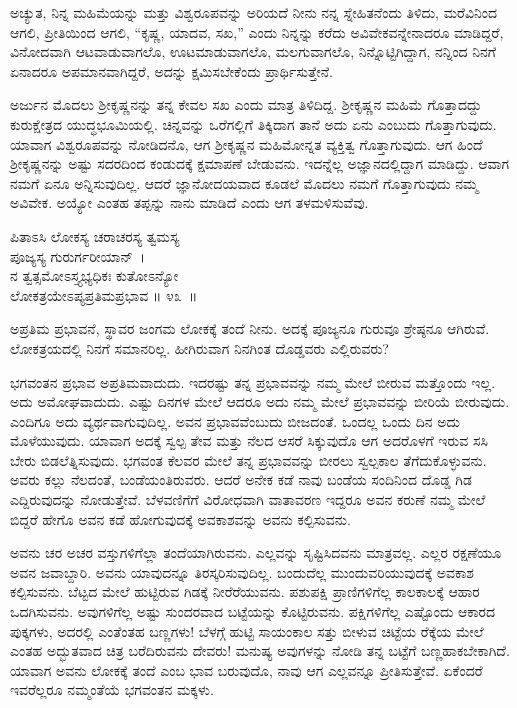 \begin{artha}
ಅಚ್ಯುತ, ನಿನ್ನ ಮಹಿಮೆಯನ್ನು ಮತ್ತು ವಿಶ್ವರೂಪವನ್ನು ಅರಿಯದೆ ನೀನು ನನ್ನ ಸ್ನೇಹಿತನೆಂದು ತಿಳಿದು, ಮರೆವಿನಿಂದ ಆಗಲಿ, ಪ್ರೀತಿಯಿಂದ ಆಗಲಿ, “ಕೃಷ್ಣ, ಯಾದವ, ಸಖ,” ಎಂದು ನಿನ್ನನ್ನು ಕರೆದು ಅವಿವೇಕವನ್ನೇನಾದರೂ ಮಾಡಿದ್ದರೆ, ವಿನೋದವಾಗಿ ಆಟವಾಡುವಾಗಲೊ, ಊಟಮಾಡುವಾಗಲೊ, ಮಲಗುವಾಗಲೊ, ನಿನ್ನೊಟ್ಟಿಗಿದ್ದಾಗ, ನನ್ನಿಂದ ನಿನಗೆ ಏನಾದರೂ ಅಪಮಾನವಾಗಿದ್ದರೆ, ಅದನ್ನು ಕ್ಷಮಿಸಬೇಕೆಂದು ಪ್ರಾರ್ಥಿಸುತ್ತೇನೆ.
\end{artha}

ಅರ್ಜುನ ಮೊದಲು ಶ‍್ರೀಕೃಷ್ಣನನ್ನು ತನ್ನ ಕೇವಲ ಸಖ ಎಂದು ಮಾತ್ರ ತಿಳಿದಿದ್ದ. ಶ‍್ರೀಕೃಷ್ಣನ ಮಹಿಮೆ ಗೊತ್ತಾದದ್ದು ಕುರುಕ್ಷೇತ್ರದ ಯುದ್ಧಭೂಮಿಯಲ್ಲಿ. ಚಿನ್ನವನ್ನು ಒರೆಗಲ್ಲಿಗೆ ತಿಕ್ಕಿದಾಗ ತಾನೆ ಅದು ಏನು ಎಂಬುದು ಗೊತ್ತಾಗುವುದು. ಯಾವಾಗ ವಿಶ್ವರೂಪವನ್ನು ನೋಡಿ\-ದನೊ, ಆಗ ಶ‍್ರೀಕೃಷ್ಣನ ಮಹಿಮೋನ್ನತ ವ್ಯಕ್ತಿತ್ವ ಗೊತ್ತಾಗುವುದು. ಆಗ ಹಿಂದೆ ಶ‍್ರೀಕೃಷ್ಣನನ್ನು ಅಷ್ಟು ಸದರದಿಂದ ಕಂಡುದಕ್ಕೆ ಕ್ಷಮಾಪಣೆ ಬೇಡುವನು. ಇದನ್ನೆಲ್ಲ ಅಜ್ಞಾನದಲ್ಲಿದ್ದಾಗ ಮಾಡಿದ್ದು. ಆವಾಗ ನಮಗೆ ಏನೂ ಅನ್ನಿಸುವುದಿಲ್ಲ. ಆದರೆ ಜ್ಞಾನೋದಯವಾದ ಕೂಡಲೆ ಮೊದಲು ನಮಗೆ ಗೊತ್ತಾಗುವುದು ನಮ್ಮ ಅವಿವೇಕ. ಅಯ್ಯೋ ಎಂತಹ ತಪ್ಪನ್ನು ನಾನು ಮಾಡಿದೆ ಎಂದು ಆಗ ತಳಮಳಿಸುವೆವು.

\begin{shloka}
ಪಿತಾಽಸಿ ಲೋಕಸ್ಯ ಚರಾಚರಸ್ಯ ತ್ವಮಸ್ಯ \\ ಪೂಜ್ಯಸ್ಯ ಗುರುರ್ಗರೀಯಾನ್~।\\ನ ತ್ವತ್ಸಮೋಽಸ್ತ್ಯಭ್ಯಧಿಕಃ ಕುತೋಽನ್ಯೋ \\ ಲೋಕತ್ರಯೇಽಪ್ಯಪ್ರತಿಮಪ್ರಭಾವ \hfill॥ ೪೩~॥
\end{shloka}

\begin{artha}
ಅಪ್ರತಿಮ ಪ್ರಭಾವನೆ, ಸ್ಥಾವರ ಜಂಗಮ ಲೋಕಕ್ಕೆ ತಂದೆ ನೀನು. ಅದಕ್ಕೆ ಪೂಜ್ಯನೂ ಗುರುವೂ ಶ್ರೇಷ್ಠನೂ ಆಗಿರುವೆ. ಲೋಕತ್ರಯದಲ್ಲಿ ನಿನಗೆ ಸಮಾನರಿಲ್ಲ. ಹೀಗಿರುವಾಗ ನಿನಗಿಂತ ದೊಡ್ಡವರು ಎಲ್ಲಿರುವರು?
\end{artha}

ಭಗವಂತನ ಪ್ರಭಾವ ಅಪ್ರತಿಮವಾದುದು. ಇದರಷ್ಟು ತನ್ನ ಪ್ರಭಾವವನ್ನು ನಮ್ಮ ಮೇಲೆ ಬೀರುವ ಮತ್ತೊಂದು ಇಲ್ಲ. ಅದು ಅಮೋಘವಾದುದು. ಎಷ್ಟು ದಿನಗಳ ಮೇಲೆ ಆದರೂ ಅದು ನಮ್ಮ ಮೇಲೆ ಪ್ರಭಾವವನ್ನು ಬೀರಿಯೆ ಬೀರುವುದು. ಎಂದಿಗೂ ಅದು ವ್ಯರ್ಥವಾಗುವುದಿಲ್ಲ. ಅವನ ಪ್ರಭಾವವೆಂಬುದು ಬೀಜದಂತೆ. ಒಂದಲ್ಲ ಒಂದು ದಿನ ಅದು ಮೊಳೆಯುವುದು. ಯಾವಾಗ ಅದಕ್ಕೆ ಸ್ವಲ್ಪ ತೇವ ಮತ್ತು ನೆಲದ ಆಸರೆ ಸಿಕ್ಕುವುದೊ ಆಗ ಅದರೊಳಗೆ ಇರುವ ಸಸಿ ಬೇರು ಬಿಡಲೆತ್ನಿಸುವುದು. ಭಗವಂತ ಕೆಲವರ ಮೇಲೆ ತನ್ನ ಪ್ರಭಾವವನ್ನು ಬೀರಲು ಸ್ವಲ್ಪಕಾಲ ತೆಗೆದುಕೊಳ್ಳುವನು. ಅವರು ಕಲ್ಲು ನೆಲದಂತೆ, ಬಂಡೆಯಂತಿರುವರು. ಆದರೆ ಅನೇಕ ಕಡೆ ನಾವು ಬಂಡೆಯ ಸಂದಿನಿಂದ ದೊಡ್ಡ ಗಿಡ ಎದ್ದಿರುವುದನ್ನು ನೋಡುತ್ತೇವೆ. ಬೆಳವಣಿಗೆಗೆ ವಿರೋಧವಾಗಿ ವಾತಾವರಣ ಇದ್ದರೂ ಅವನ ಕರುಣೆ ನಮ್ಮ ಮೇಲೆ ಬಿದ್ದರೆ ಹೇಗೊ ಅವನ ಕಡೆ ಹೋಗುವುದಕ್ಕೆ ಅವಕಾಶವನ್ನು ಅವನು ಕಲ್ಪಿಸುವನು.

ಅವನು ಚರ ಅಚರ ವಸ್ತುಗಳಿಗೆಲ್ಲಾ ತಂದೆಯಾಗಿರುವನು. ಎಲ್ಲವನ್ನು ಸೃಷ್ಟಿಸಿದವನು ಮಾತ್ರವಲ್ಲ. ಎಲ್ಲರ ರಕ್ಷಣೆಯೂ ಅವನ ಜವಾಬ್ದಾರಿ. ಅವನು ಯಾವುದನ್ನೂ ತಿರಸ್ಕರಿಸುವುದಿಲ್ಲ. ಬಂದುದೆಲ್ಲ ಮುಂದುವರಿಯುವುದಕ್ಕೆ ಅವಕಾಶ ಕಲ್ಪಿಸುವನು. ಬೆಟ್ಟದ ಮೇಲೆ ಹುಟ್ಟಿರುವ ಗಿಡಕ್ಕೆ ನೀರೆರೆಯುವನು. ಪಶುಪಕ್ಷಿ ಪ್ರಾಣಿಗಳಿಗೆಲ್ಲ ಕಾಲಕಾಲಕ್ಕೆ ಆಹಾರ ಒದಗಿಸುವನು. ಅವುಗಳಿಗೆಲ್ಲ ಅಷ್ಟು ಸುಂದರವಾದ ಬಟ್ಟೆಯನ್ನು ಕೊಟ್ಟಿರುವನು. ಪಕ್ಷಿಗಳಿಗೆಲ್ಲ ಎಷ್ಟೊಂದು ಆಕಾರದ ಪುಕ್ಕಗಳು, ಅದರಲ್ಲಿ ಎಂತೆಂತಹ ಬಣ್ಣಗಳು! ಬೆಳಗ್ಗೆ ಹುಟ್ಟಿ ಸಾಯಂಕಾಲ ಸತ್ತು ಬೀಳುವ ಚಿಟ್ಟೆಯ ರೆಕ್ಕೆಯ ಮೇಲೆ ಎಂತಹ ಅದ್ಭುತವಾದ ಚಿತ್ರ ಬರೆದಿರುವನು ದೇವರು! ಮನುಷ್ಯ ಅವುಗಳನ್ನು ನೋಡಿ ತನ್ನ ಬಟ್ಟೆಗೆ ಬಣ್ಣಹಾಕಬೇಕಾಗಿದೆ. ಯಾವಾಗ ಅವನು ಲೋಕಕ್ಕೆ ತಂದೆ ಎಂಬ ಭಾವ ಬರುವುದೊ, ನಾವು ಆಗ ಎಲ್ಲವನ್ನೂ ಪ್ರೀತಿಸುತ್ತೇವೆ. ಏಕೆಂದರೆ ಇವರೆಲ್ಲರೂ ನಮ್ಮಂತೆಯೆ ಭಗವಂತನ ಮಕ್ಕಳು.

